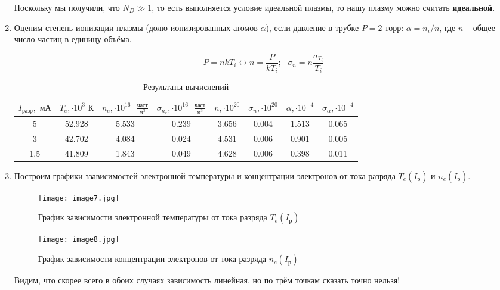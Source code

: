 \documentclass[a4paper,12pt]{article} %
\begin{document}
\begin{enumerate}
    Поскольку мы получили, что $N_{D} \gg 1$, то есть выполняется условие идеальной плазмы, то нашу плазму можно считать \textbf{идеальной}.

    \item Оценим степень ионизации плазмы (долю ионизированных атомов $\alpha$), если давление в трубке $P=2\text{ торр}$: $\alpha = n_{i}/n$, где $n$ -- общее число частиц в единицу объёма.

    \[ P=nkT_{i} \longleftrightarrow n = \frac{P}{kT_{i}}; \text{ } \sigma_n = n\frac{\sigma_{T_i}}{T_i} \]

    \begin{table}[h]
	\centering
	\begin{tabular}{|c|c|c|c|c|c|c|c|}
            \hline
            $I_{\text{разр}}, \text{ мА}$ & $T_e, \cdot 10^3 \text{ К}$ & $n_e, \cdot 10^{16} \text{ }\frac{\text{част}}{\text{м}^3}$ & $\sigma_{n_e}, \cdot 10^{16} \text{ }\frac{\text{част}}{\text{м}^3}$ & $ n, \cdot 10^{20} $ & $ \sigma_{n}, \cdot 10^{20} $ & $\alpha,  \cdot 10^{-4}$ & $\sigma_{\alpha},  \cdot 10^{-4}$  \\ \hline
            5 &  52.928 & 5.533 & 0.239 & 3.656 & 0.004 & 1.513 & 0.065 \\ \hline
            3 &  42.702 & 4.084 & 0.024 & 4.531 & 0.006 & 0.901 & 0.005 \\ \hline
            1.5 & 41.809 & 1.843 & 0.049 & 4.628 & 0.006 & 0.398 & 0.011 \\ \hline
	\end{tabular}
	\caption{Результаты вычислений}
	\label{tab11}
    \end{table}

    \item Построим графики ззависимостей электронной температуры и концентрации электронов от тока разряда $T_{e}(I_{\text{р}})$ и $n_{e}(I_{\text{р}})$.

    \begin{figure}[h]
    \begin{center}
    		\texttt{[image: image7.jpg]}
    \end{center}
    	\caption{График зависимости электронной температуры от тока разряда $T_{e}(I_{\text{р}})$}
    	\label{img7}
    \end{figure}

    \begin{figure}[h]
    \begin{center}
    		\texttt{[image: image8.jpg]}
    \end{center}
    	\caption{График зависимости концентрации электронов от тока разряда $n_{e}(I_{\text{р}})$}
    	\label{img8}
    \end{figure}

     Видим, что скорее всего в обоих случаях зависимость линейная, но по трём точкам сказать точно нельзя!
    
\end{enumerate}
\end{document}
